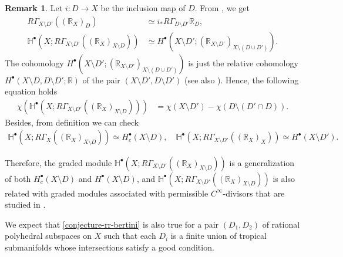 \documentclass[a4paper,dvipdfmx,reqno,12pt]{amsart}
\theoremstyle{definition}
\newtheorem{remark}[theorem]{Remark}
\numberwithin{equation}{section}
\begin{document}
\begin{remark}
Let $i\colon D\to X$ be the inclusion map of $D$.
From 
\cite[(2.3.20)]{MR1299726}, we get
\begin{align}
R\Gamma_{X\setminus D'}((\mathbb{R}_X)_D)
&\simeq i_* R\Gamma_{D\setminus D'}\mathbb{R}_D, \\ 
\mathbb{H}^{\bullet}(X;R\Gamma_{X\setminus D'}((\mathbb{R}_X)_{X\setminus D}))
&\simeq H^{\bullet}(X\setminus D';(\mathbb{R}_{X\setminus D'})_{X\setminus (D\cup D')}).
\end{align}
The cohomology $H^{\bullet}(X\setminus D';(\mathbb{R}_{X\setminus D'})_{X\setminus (D\cup D')})$
is just the relative cohomology 
$H^{\bullet}(X\setminus D,D\setminus D';\mathbb{R})$
of the pair
$(X\setminus D', D\setminus D')$
\cite[Chapter IV. Definition 8.1]{MR842190}
(see also \cite[Chapter II. Proposition 12.3]{MR1481706}).
Hence, the following equation holds
\begin{align}
\chi(\mathbb{H}^{\bullet}(X;R\Gamma_{X\setminus D'}((\mathbb{R}_X)_{X\setminus D})))
&=\chi(X\setminus D')
- \chi(D\setminus (D'\cap D)).
\end{align}
Besides, from definition we can check
\begin{align}
\mathbb{H}^{\bullet}(X;R\Gamma_{X}
((\mathbb{R}_X)_{X\setminus D}))
\simeq H^{\bullet}_c(X\setminus D), \quad
\mathbb{H}^{\bullet}(X;R\Gamma_{X\setminus D'}
((\mathbb{R}_X)_{X}))
\simeq H^{\bullet}(X\setminus D').
\end{align}

Therefore, the graded module 
$\mathbb{H}^{\bullet}(X;R\Gamma_{X\setminus D'}
((\mathbb{R}_X)_{X\setminus D}))$
is a generalization of both
$H^{\bullet}_c(X\setminus D)$ and
$H^{\bullet}(X\setminus D)$, and
$\mathbb{H}^{\bullet}(X;R\Gamma_{X\setminus D'}
((\mathbb{R}_X)_{X\setminus D}))$ is also related
with graded modules associated with
permissible $C^{\infty}$-divisors that are
studied in \cite{tsutsui2023graded}.

We expect that \cref{conjecture-rr-bertini}
is also true for a pair $(D_1,D_2)$ of rational polyhedral
subspaces on $X$ such that each $D_i$ is
a finite union of tropical submanifolds whose
intersections satisfy a good condition.
\end{remark}

\appendix
\end{document}
